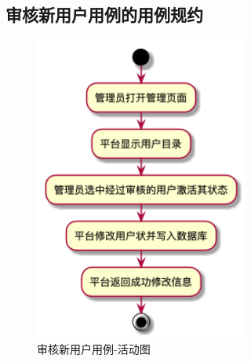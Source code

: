 \subsection{审核新用户用例的用例规约}
\begin{figure}[htp]
    \centering
    \includegraphics[width=7cm]{report/figure/usecase_v2/activate.png}
    \caption{审核新用户用例-活动图}
    \label{fig:activate}
\end{figure}


